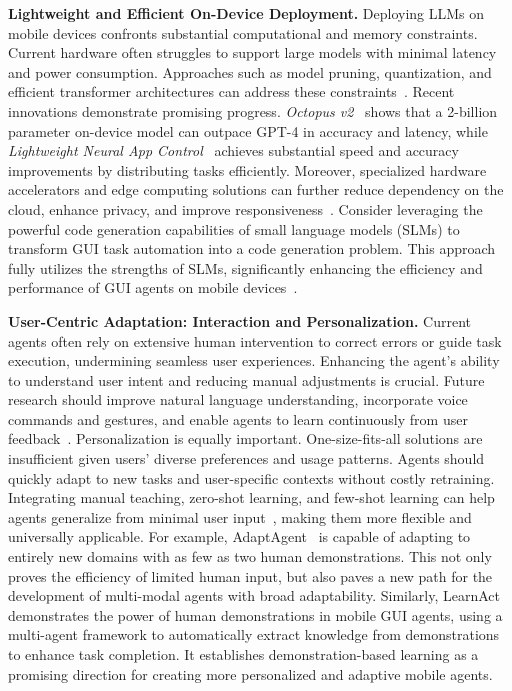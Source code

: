 \noindent\textbf{Lightweight and Efficient On-Device Deployment.}
Deploying LLMs on mobile devices confronts substantial computational and memory constraints. Current hardware often struggles to support large models with minimal latency and power consumption. Approaches such as model pruning, quantization, and efficient transformer architectures can address these constraints~\cite{ding2024mobileagentsop}. 
Recent innovations demonstrate promising progress. \textit{Octopus v2}~\cite{chen2024octopus} shows that a 2-billion parameter on-device model can outpace GPT-4 in accuracy and latency, while \textit{Lightweight Neural App Control}~\cite{christianos2024lightweight} achieves substantial speed and accuracy improvements by distributing tasks efficiently. Moreover, specialized hardware accelerators and edge computing solutions can further reduce dependency on the cloud, enhance privacy, and improve responsiveness~\cite{wang2024mobileagentv2}. 
Consider leveraging the powerful code generation capabilities of small language models (SLMs) to transform GUI task automation into a code generation problem. This approach fully utilizes the strengths of SLMs, significantly enhancing the efficiency and performance of GUI agents on mobile devices~\cite{wen2024autodroidv2, wang2024comprehensive}.



\noindent\textbf{User-Centric Adaptation: Interaction and Personalization.}
Current agents often rely on extensive human intervention to correct errors or guide task execution, undermining seamless user experiences. Enhancing the agent's ability to understand user intent and reducing manual adjustments is crucial. Future research should improve natural language understanding, incorporate voice commands and gestures, and enable agents to learn continuously from user feedback~\cite{lee2023exploremobilegpt,wang2024mobileagentv1, wang2024mobileagentv2, citation-111}.
Personalization is equally important. One-size-fits-all solutions are insufficient given users' diverse preferences and usage patterns. Agents should quickly adapt to new tasks and user-specific contexts without costly retraining. Integrating manual teaching, zero-shot learning, and few-shot learning can help agents generalize from minimal user input~\cite{sodhi2024step, lee2023exploremobilegpt,song2024visiontasker,li2024uinav}, making them more flexible and universally applicable.
For example, AdaptAgent~\cite{verma2024adaptagent} is capable of adapting to entirely new domains with as few as two human demonstrations. This not only proves the efficiency of limited human input, but also paves a new path for the development of multi-modal agents with broad adaptability. Similarly, LearnAct~\cite{liu2025learnact} demonstrates the power of human demonstrations in mobile GUI agents, using a multi-agent framework to automatically extract knowledge from demonstrations to enhance task completion. It establishes demonstration-based learning as a promising direction for creating more personalized and adaptive mobile agents.



